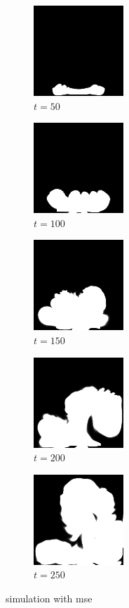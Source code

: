 \documentclass[a4paper,12pt,twoside]{report}
\begin{document}
\begin{figure}
\centering
\begin{subfigure}{0.18\textwidth}
  \centering
  \includegraphics[scale=0.56]{buoyancy_test/dens_000050_mse.png}
  \caption{$t=50$}
\end{subfigure}
\begin{subfigure}{0.18\textwidth}
  \centering
  \includegraphics[scale=0.56]{buoyancy_test/dens_000100_mse.png}
  \caption{$t=100$}
\end{subfigure}
\begin{subfigure}{0.18\textwidth}
  \centering
  \includegraphics[scale=0.56]{buoyancy_test/dens_000150_mse.png}
  \caption{$t=150$}
\end{subfigure}
\begin{subfigure}{0.18\textwidth}
  \centering
  \includegraphics[scale=0.56]{buoyancy_test/dens_000200_mse.png}
  \caption{$t=200$}
\end{subfigure}
\begin{subfigure}{0.18\textwidth}
  \centering
  \includegraphics[scale=0.56]{buoyancy_test/dens_000249_mse.png}
  \caption{$t=250$}
\end{subfigure}
\caption{simulation with mse}
\end{figure}
\end{document}

